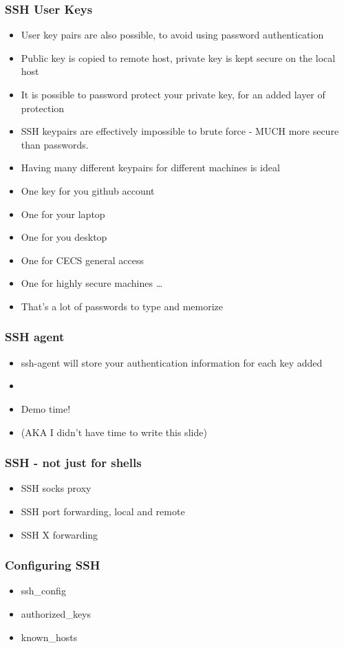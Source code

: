 \documentclass{beamer}
\begin{document}
\begin{frame}
  \frametitle{SSH User Keys}
  \begin{itemize}
    \item User key pairs are also possible, to avoid using password authentication
    \item Public key is copied to remote host, private key is kept secure on the local host
    \item It is possible to password protect your private key, for an added layer of protection
    \item SSH keypairs are effectively impossible to brute force - MUCH more secure than passwords.
      \pause
    \item Having many different keypairs for different machines is ideal
    \item One key for you github account
    \item One for your laptop
    \item One for you desktop
    \item One for CECS general access
    \item One for highly secure machines
      \pause
    \ldots
    \item That's a lot of passwords to type and memorize
  \end{itemize}
\end{frame}

\begin{frame}
  \frametitle{SSH agent}
  \begin{itemize}
    \item ssh-agent will store your authentication information for each key added
    \item 
    \item Demo time!
    \item (AKA I didn't have time to write this slide)
  \end{itemize}
\end{frame}

\begin{frame}
  \frametitle{SSH - not just for shells}
  \begin{itemize}
    \item SSH socks proxy
    \item SSH port forwarding, local and remote
    \item SSH X forwarding
  \end{itemize}
\end{frame}

\begin{frame}
  \frametitle{Configuring SSH}
  \begin{itemize}
    \item ssh\_config
    \item authorized\_keys
    \item known\_hosts
  \end{itemize}
\end{frame}
\end{document}
